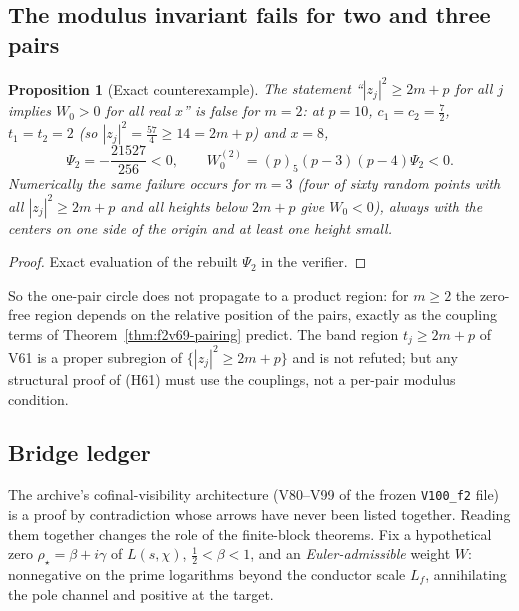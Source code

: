 \documentclass[11pt]{article}
\newtheorem{proposition}[theorem]{Proposition}
\theoremstyle{definition}
\theoremstyle{remark}
\begin{document}
\subsection{The modulus invariant fails for two and three pairs}

\begin{proposition}[Exact counterexample]
\label{prop:f2v69-witness}
The statement ``\(|z_j|^2\ge2m+p\) for all \(j\) implies \(W_0>0\) for
all real \(x\)'' is false for \(m=2\): at \(p=10\), \(c_1=c_2=\tfrac72\),
\(t_1=t_2=2\) (so \(|z_j|^2=\tfrac{57}4\ge14=2m+p\)) and \(x=8\),
\begin{equation}
 \Psi_2=-\frac{21527}{256}<0,\qquad W_0^{(2)}=(p)_5(p-3)(p-4)\Psi_2<0 .
 \label{eq:f2v69-witness}
\end{equation}
Numerically the same failure occurs for \(m=3\) (four of sixty random
points with all \(|z_j|^2\ge2m+p\) and all heights below \(2m+p\) give
\(W_0<0\)), always with the centers on one side of the origin and at
least one height small.
\end{proposition}

\begin{proof}
Exact evaluation of the rebuilt \(\Psi_2\) in the verifier.
\end{proof}

So the one-pair circle does not propagate to a product region: for
\(m\ge2\) the zero-free region depends on the relative position of the
pairs, exactly as the coupling terms of Theorem~\ref{thm:f2v69-pairing}
predict.  The band region \(t_j\ge2m+p\) of V61 is a proper subregion of
\(\{|z_j|^2\ge2m+p\}\) and is not refuted; but any structural proof of
(H61) must use the couplings, not a per-pair modulus condition.

\subsection{Bridge ledger}
\label{sub:f2v69-ledger}

The archive's cofinal-visibility architecture (V80--V99 of the frozen
\texttt{V100\_f2} file) is a proof by contradiction whose arrows have
never been listed together.  Reading them together changes the role of
the finite-block theorems.  Fix a hypothetical zero
\(\rho_\star=\beta+i\gamma\) of \(L(s,\chi)\), \(\tfrac12<\beta<1\), and an
\emph{Euler-admissible} weight \(W\): nonnegative on the prime logarithms
beyond the conductor scale \(L_f\), annihilating the pole channel and
positive at the target.
\end{document}
